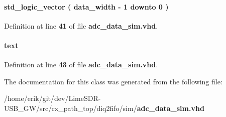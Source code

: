 \paragraph[{B\+Q\+\_\+reg}]{ {\bfseries \textcolor{comment}{std\+\_\+logic\+\_\+vector}\textcolor{vhdlchar}{ }\textcolor{vhdlchar}{(}\textcolor{vhdlchar}{ }\textcolor{vhdlchar}{ }\textcolor{vhdlchar}{ }\textcolor{vhdlchar}{ }{\bfseries {\bf data\+\_\+width}} \textcolor{vhdlchar}{-\/}\textcolor{vhdlchar}{ } \textcolor{vhdldigit}{1} \textcolor{vhdlchar}{ }\textcolor{keywordflow}{downto}\textcolor{vhdlchar}{ }\textcolor{vhdlchar}{ } \textcolor{vhdldigit}{0} \textcolor{vhdlchar}{ }\textcolor{vhdlchar}{)}\textcolor{vhdlchar}{ }} \hspace{0.3cm}{\ttfamily [Signal]}}\label{classadc__data__sim_1_1arch_a49c4ef2c671cb1b1dafab32c9c37ffbd}


Definition at line {\bf 41} of file {\bf adc\+\_\+data\+\_\+sim.\+vhd}.

\paragraph[{fp}]{ {\bfseries \textcolor{vhdlchar}{text}\textcolor{vhdlchar}{ }} \hspace{0.3cm}{\ttfamily [File]}}\label{classadc__data__sim_1_1arch_a2659ff282ca7786f0ef17543598533fa}


Definition at line {\bf 43} of file {\bf adc\+\_\+data\+\_\+sim.\+vhd}.



The documentation for this class was generated from the following file\+:\begin{DoxyCompactItemize}
\item 
/home/erik/git/dev/\+Lime\+S\+D\+R-\/\+U\+S\+B\+\_\+\+G\+W/src/rx\+\_\+path\+\_\+top/diq2fifo/sim/{\bf adc\+\_\+data\+\_\+sim.\+vhd}\end{DoxyCompactItemize}
